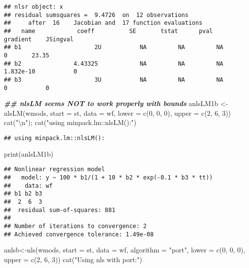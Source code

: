 \documentclass[
]{article}
\newenvironment{Shaded}{\begin{snugshade}}{\end{snugshade}}
\newcommand{\AttributeTok}[1]{\textcolor[rgb]{0.77,0.63,0.00}{#1}}
\newcommand{\DecValTok}[1]{\textcolor[rgb]{0.00,0.00,0.81}{#1}}
\newcommand{\DocumentationTok}[1]{\textcolor[rgb]{0.56,0.35,0.01}{\textbf{\textit{#1}}}}
\newcommand{\FunctionTok}[1]{\textcolor[rgb]{0.00,0.00,0.00}{#1}}
\newcommand{\NormalTok}[1]{#1}
\newcommand{\OtherTok}[1]{\textcolor[rgb]{0.56,0.35,0.01}{#1}}
\newcommand{\SpecialCharTok}[1]{\textcolor[rgb]{0.00,0.00,0.00}{#1}}
\newcommand{\StringTok}[1]{\textcolor[rgb]{0.31,0.60,0.02}{#1}}
\begin{document}
\begin{verbatim}
## nlsr object: x 
## residual sumsquares =  9.4726  on  12 observations
##     after  16    Jacobian and  17 function evaluations
##   name            coeff          SE       tstat      pval      gradient    JSingval   
## b1                     2U           NA         NA         NA           0       23.35  
## b2               4.43325            NA         NA         NA   1.832e-10           0  
## b3                     3U           NA         NA         NA           0           0
\end{verbatim}

\begin{Shaded}
\begin{Highlighting}[]
\DocumentationTok{\#\# nlsLM seems NOT to work properly with bounds}
\NormalTok{anlsLM1b }\OtherTok{\textless{}{-}} \FunctionTok{nlsLM}\NormalTok{(wmods, }\AttributeTok{start =}\NormalTok{ st, }\AttributeTok{data =}\NormalTok{ wf, }\AttributeTok{lower =} \FunctionTok{c}\NormalTok{(}\DecValTok{0}\NormalTok{, }\DecValTok{0}\NormalTok{, }\DecValTok{0}\NormalTok{), }\AttributeTok{upper =} \FunctionTok{c}\NormalTok{(}\DecValTok{2}\NormalTok{, }\DecValTok{6}\NormalTok{, }\DecValTok{3}\NormalTok{))}
\FunctionTok{cat}\NormalTok{(}\StringTok{"}\SpecialCharTok{\textbackslash{}n}\StringTok{"}\NormalTok{); }\FunctionTok{cat}\NormalTok{(}\StringTok{"using minpack.lm::nlsLM():"}\NormalTok{)}
\end{Highlighting}
\end{Shaded}

\begin{verbatim}
## using minpack.lm::nlsLM():
\end{verbatim}

\begin{Shaded}
\begin{Highlighting}[]
\FunctionTok{print}\NormalTok{(anlsLM1b)}
\end{Highlighting}
\end{Shaded}

\begin{verbatim}
## Nonlinear regression model
##   model: y ~ 100 * b1/(1 + 10 * b2 * exp(-0.1 * b3 * tt))
##    data: wf
## b1 b2 b3 
##  2  6  3 
##  residual sum-of-squares: 881
## 
## Number of iterations to convergence: 2 
## Achieved convergence tolerance: 1.49e-08
\end{verbatim}

\begin{Shaded}
\begin{Highlighting}[]
\NormalTok{anlsb}\OtherTok{\textless{}{-}}\FunctionTok{nls}\NormalTok{(wmods, }\AttributeTok{start =}\NormalTok{ st, }\AttributeTok{data =}\NormalTok{ wf, }\AttributeTok{algorithm =} \StringTok{"port"}\NormalTok{, }\AttributeTok{lower =} \FunctionTok{c}\NormalTok{(}\DecValTok{0}\NormalTok{, }\DecValTok{0}\NormalTok{, }\DecValTok{0}\NormalTok{), }\AttributeTok{upper =} \FunctionTok{c}\NormalTok{(}\DecValTok{2}\NormalTok{, }\DecValTok{6}\NormalTok{, }\DecValTok{3}\NormalTok{))}
\FunctionTok{cat}\NormalTok{(}\StringTok{"Using nls with \textquotesingle{}port\textquotesingle{}:"}\NormalTok{)}
\end{Highlighting}
\end{Shaded}
\end{document}
